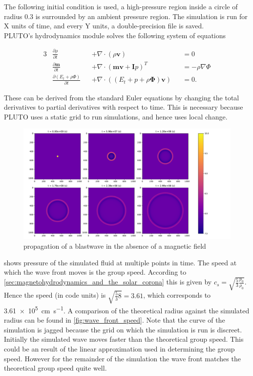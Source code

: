 \documentclass{article}
\begin{document}
The following initial condition is used, a high-pressure region inside a circle of radius 0.3 is surrounded by an ambient pressure region. The simulation is run for X units of time, and every Y units, a double-precision file is saved.\\

PLUTO's hydrodynamics module solves the following system of equations

\begin{alignat}{3}
    &\frac{\partial \rho}{\partial t} &&+ \nabla \cdot (\rho \mathbf v) &&= 0 \tag{mass}\label{masscont}\\
    &\frac{\partial \mathbf m}{\partial t} &&+  \nabla \cdot (\mathbf{mv + I}p)^T &&= -\rho \nabla \Phi \tag{moment}\label{cauchymoment}\\
    &\frac{\partial(E_t + \rho \Phi)}{\partial t} &&+ \nabla \cdot ((E_t + p +\rho\mathbf{\Phi})\mathbf{v}) &&= 0 \tag{energy}\label{energy}.
\end{alignat}

These can be derived from the standard Euler equations by changing the total derivatives to partial derivatives with respect to time. This is necessary because PLUTO uses a static grid to run simulations, and hence uses local change. 
\begin{figure}[h]
	\centering
	\includegraphics[width=\textwidth]{figures/blast_wave.pdf}
	\caption{propagation of a blastwave in the absence of a magnetic field}
	\label{fig:blastwave}
\end{figure}

 shows pressure of the simulated fluid at multiple points in time. 
The speed at which the wave front moves is the group speed. 
According to \cref{sec:magnetohydrodynamics_and_the_solar_corona} this is given by $c_s = \sqrt{\frac{5}{3} \frac{p_0}{\rho_0}} $. Hence the speed (in code units) is $\sqrt{\frac{5}{3}8} = 3.61$, which corresponds to \SI{3.61e5}{\centi\metre\per\second}.
A comparison of the theoretical radius against the simulated radius can be found in \cref{fig:wave_front_speed}. 
Note that the curve of the simulation is jagged because the grid on which the simulation is run is discreet. 
Initially the simulated wave moves faster than the theoretical group speed. 
This could be an result of the linear approximation used in determining the group speed.
However for the remainder of the simulation the wave front matches the theoretical group speed quite well.
\end{document}
